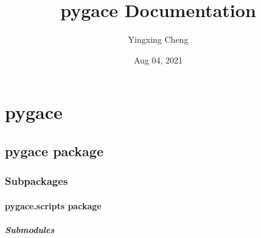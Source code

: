 \documentclass[letterpaper,10pt,english]{sphinxmanual}
\title{pygace Documentation}
\date{Aug 04, 2021}
\author{Yingxing Cheng}
\begin{document}
\pagestyle{empty}
\sphinxmaketitle
\pagestyle{plain}
\sphinxtableofcontents
\pagestyle{normal}
\label{\detokenize{index::doc}}



\chapter{pygace}
\label{\detokenize{modules:pygace}}\label{\detokenize{modules::doc}}

\section{pygace package}
\label{\detokenize{pygace:pygace-package}}\label{\detokenize{pygace::doc}}

\subsection{Subpackages}
\label{\detokenize{pygace:subpackages}}

\subsubsection{pygace.scripts package}
\label{\detokenize{pygace.scripts:pygace-scripts-package}}\label{\detokenize{pygace.scripts::doc}}

\paragraph{Submodules}
\label{\detokenize{pygace.scripts:submodules}}
\end{document}
